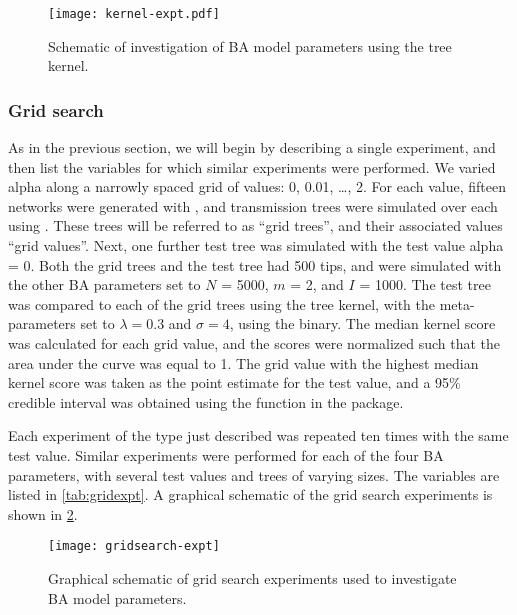 \begin{figure}[ht]
  \centering
  \texttt{[image: kernel-expt.pdf]}
  \caption[Schematic of kernel classifier experiment]{
    Schematic of investigation of \gls{BA} model parameters using the tree
    kernel.
  }
  \label{fig:kernelexpt}
\end{figure}

\subsubsection*{Grid search}

As in the previous section, we will begin by describing a single experiment,
and then list the variables for which similar experiments were performed. We
varied \gls{alpha} along a narrowly spaced grid of values: 0, 0.01, \ldots, 2.
For each value, fifteen networks were generated with , and
transmission trees were simulated over each using . These
trees will be referred to as ``grid trees'', and their associated values ``grid
values''. Next, one further test tree was simulated with the test value
\gls{alpha} = 0. Both the grid trees and the test tree had 500 tips, and were
simulated with the other \gls{BA} parameters set to $N$ = 5000, $m$ = 2, and
$I$ = 1000. The test tree was compared to each of the grid trees using the tree
kernel, with the meta-parameters set to $\lambda = 0.3$ and $\sigma = 4$, using
the  binary. The median kernel score was calculated for
each grid value, and the scores were normalized such that the area under the
curve was equal to 1. The grid value with the highest median kernel score was
taken as the point estimate for the test value, and a 95\% credible interval
was obtained using the  function in the 
package.

Each experiment of the type just described was repeated ten times with the same
test value. Similar experiments were performed for each of the four \gls{BA}
parameters, with several test values and trees of varying sizes. The variables
are listed in \cref{tab:gridexpt}. A graphical schematic of the grid search
experiments is shown in \cref{fig:gridexpt}.

\begin{figure}[ht]
  \centering
  \texttt{[image: gridsearch-expt]}
  \caption{Graphical schematic of grid search experiments used to investigate 
    \gls{BA} model parameters.}
  \label{fig:gridexpt}
\end{figure}

